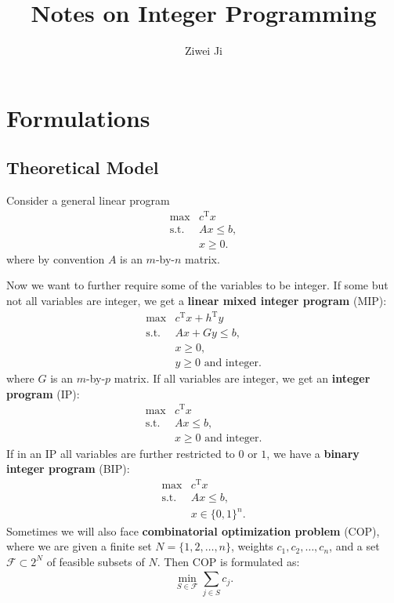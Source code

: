 \documentclass[openany]{book}
\author{Ziwei Ji}
\title{Notes on Integer Programming}
\begin{document}
\maketitle
\tableofcontents

\chapter{Formulations}
\section{Theoretical Model}
Consider a general linear program
\begin{equation}
    \begin{array}{rl}
        \max & c^{\mathrm{T}}x \\
        \mathrm{s.t.} & Ax\le b, \\
         & x\ge0.
    \end{array}
\end{equation}
where by convention $A$ is an $m$-by-$n$ matrix.

Now we want to further require some of the variables to be integer. If some but not all variables are integer, we get a \textbf{linear mixed integer program} (MIP):
\begin{equation}
    \begin{array}{rl}
        \max & c^{\mathrm{T}}x+h^{\mathrm{T}}y \\
        \mathrm{s.t.} & Ax+Gy\le b, \\
         & x\ge0, \\
         & y\ge0\textrm{ and integer}.
    \end{array}
\end{equation}
where $G$ is an $m$-by-$p$ matrix. If all variables are integer, we get an \textbf{integer program} (IP):
\begin{equation}
    \begin{array}{rl}
        \max & c^{\mathrm{T}}x \\
        \mathrm{s.t.} & Ax\le b, \\
         & x\ge0\textrm{ and integer}.
    \end{array}
\end{equation}
If in an IP all variables are further restricted to $0$ or $1$, we have a \textbf{binary integer program} (BIP):
\begin{equation}
    \begin{array}{rl}
        \max & c^{\mathrm{T}}x \\
        \mathrm{s.t.} & Ax\le b, \\
         & x\in\{0,1\}^n.
    \end{array}
\end{equation}
Sometimes we will also face \textbf{combinatorial optimization problem} (COP), where we are given a finite set $N=\{1,2,\ldots,n\}$, weights $c_1,c_2,\ldots,c_n$, and a set $\mathcal{F}\subset 2^{N}$ of feasible subsets of $N$. Then COP is formulated as:
\begin{equation}
    \min_{S\in \mathcal{F}}^{}\sum_{j\in S}^{}c_j.
\end{equation}
\end{document}
